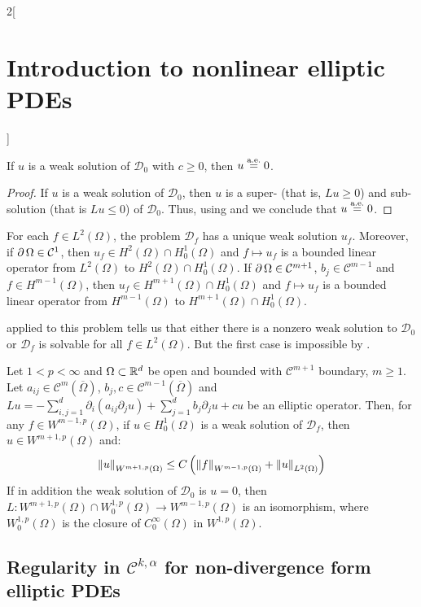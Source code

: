 \documentclass[../../../main_math.tex]{subfiles}
\begin{document}
\begin{multicols}{2}[\section{Introduction to nonlinear elliptic PDEs}]
\begin{corollary}
    If $u$ is a weak solution of $\mathcal{D}_0$ with $c\geq 0$, then $u\overset{\text{a.e.}}{=}0$.
  \end{corollary}
  \begin{proof}
    If $u$ is a weak solution of $\mathcal{D}_0$, then $u$ is a super- (that is, $Lu\geq 0$) and sub-solution (that is $Lu\leq 0$) of $\mathcal{D}_0$. Thus, using  and  we conclude that $u\overset{\text{a.e.}}{=}0$.
  \end{proof}
  \begin{corollary}
    For each $f\in L^2(\Omega)$, the problem $\mathcal{D}_f$ has a unique weak solution $u_f$. Moreover, if $\operatorname{\partial}{\Omega}\in\mathcal{C}^1$, then $u_f\in H^2(\Omega)\cap H_0^1(\Omega)$ and $f\mapsto u_f$ is a bounded linear operator from $L^2(\Omega)$ to $H^2(\Omega)\cap H_0^1(\Omega)$. If $\operatorname{\partial}{\Omega}\in\mathcal{C}^{m+1}$, $b_j\in\mathcal{C}^{m-1}$ and $f\in H^{m-1}(\Omega)$, then $u_f\in H^{m+1}(\Omega)\cap H_0^1(\Omega)$ and $f\mapsto u_f$ is a bounded linear operator from $H^{m-1}(\Omega)$ to $H^{m+1}(\Omega)\cap H_0^1(\Omega)$.
  \end{corollary}
  \begin{sproof}
     applied to this problem tells us that either there is a nonzero weak solution to $\mathcal{D}_0$ or $\mathcal{D}_f$ is solvable for all $f\in L^2(\Omega)$. But the first case is impossible by .
  \end{sproof}
  \begin{theorem}
    Let $1<p<\infty$ and $\Omega\subset\mathbb{R}^d$ be open and bounded with $\mathcal{C}^{m+1}$ boundary, $m\geq 1$. Let $a_{ij}\in \mathcal{C}^m(\overline{\Omega})$, $b_j,c\in \mathcal{C}^{m-1}(\overline{\Omega})$ and $Lu=-\sum_{i,j=1}^d \partial_i(a_{ij}\partial_j u)+\sum_{j=1}^d b_j\partial_j u+cu$ be an elliptic operator. Then, for any $f\in W^{m-1,p}(\Omega)$, if $u\in H^1_0(\Omega)$ is a weak solution of $\mathcal{D}_f$, then $u\in W^{m+1,p}(\Omega)$ and:
    $$
      \left\|u\right\|_{W^{m+1,p}(\Omega)}\leq C\left(\left\|f\right\|_{W^{m-1,p}(\Omega)}+\left\|u\right\|_{L^2(\Omega)}\right)
    $$
    If in addition the weak solution of $\mathcal{D}_0$ is $u=0$, then $L:W^{m+1,p}(\Omega)\cap W_0^{1,p}(\Omega)\to W^{m-1,p}(\Omega)$ is an isomorphism, where $W_0^{1,p}(\Omega)$ is the closure of $C_0^\infty(\Omega)$ in $W^{1,p}(\Omega)$.
  \end{theorem}
  \subsection{Regularity in \texorpdfstring{$\mathcal{C}^{k,\alpha}$}{Ckalpha} for non-divergence form elliptic PDEs}


\end{multicols}
\end{document}
